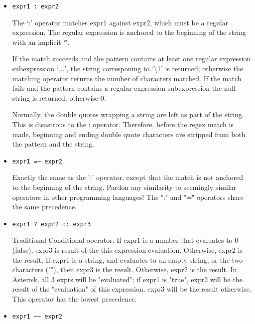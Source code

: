 \begin{itemize}
  \item \verb!expr1 : expr2!

       The `:' operator matches expr1 against expr2, which must be a
       regular expression.  The regular expression is anchored to the
       beginning of  the string with an implicit `\^'.

       If the match succeeds and the pattern contains at least one regular
       expression subexpression `\(...\)', the string corresponing
       to `\textbackslash1' is returned; otherwise the matching operator
       returns the number of characters matched.  If the match fails and
       the pattern contains a regular expression subexpression the null
       string is returned; otherwise 0.

       Normally, the double quotes wrapping a string are left as part
       of the string. This is disastrous to the : operator. Therefore,
       before the regex match is made, beginning and ending double quote
       characters are stripped from both the pattern and the string.

   \item \verb!expr1 =~ expr2!

       Exactly the same as the ':' operator, except that the match is
       not anchored to the beginning of the string. Pardon any similarity
       to seemingly similar operators in other programming languages!
       The ":" and "=\~" operators share the same precedence.

   \item \verb!expr1 ? expr2 :: expr3!

       Traditional Conditional operator. If expr1 is a number
       that evaluates to 0 (false), expr3 is result of the this
       expression evaluation.  Otherwise, expr2 is the result.
       If expr1 is a string, and evaluates to an empty string,
       or the two characters (""), then expr3 is the
       result. Otherwise, expr2 is the result.  In Asterisk, all
       3 exprs will be "evaluated"; if expr1 is "true", expr2
       will be the result of the "evaluation" of this
       expression.  expr3 will be the result otherwise. This
       operator has the lowest precedence.

   \item \verb!expr1 ~~ expr2!


\end{itemize}
